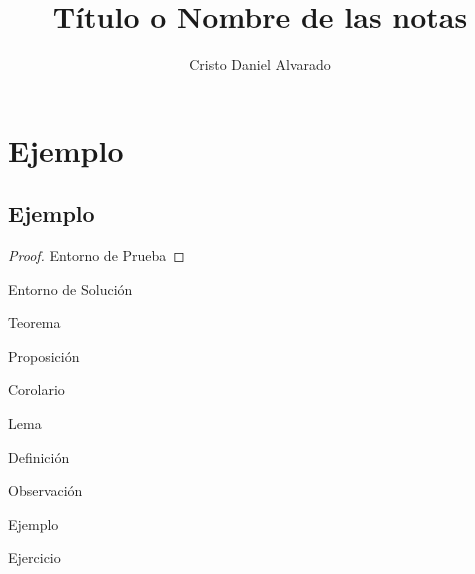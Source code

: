 \documentclass[12pt]{report}
\theoremstyle{largebreak}
\begin{document}
\setlength{\parskip}{5pt}
\setlength{\parindent}{12pt}
\title{T\'itulo o Nombre de las notas}
\author{Cristo Daniel Alvarado}
\maketitle

\tableofcontents

\lstlistoflistings

\newpage

\chapter{Ejemplo}

\section{Ejemplo}

\begin{proof}
    Entorno de Prueba
\end{proof}

\begin{sol}
    Entorno de Soluci\'on
\end{sol}

\begin{theor}[Nombre]
    Teorema
\end{theor}

\begin{propo}[Nombre]
    Proposici\'on
\end{propo}

\begin{cor}[Nombre]
    Corolario
\end{cor}

\begin{lema}[Nombre]
    Lema
\end{lema}

\begin{mydef}[Nombre]
    Definici\'on
\end{mydef}

\begin{obs}[Nombre]
    Observaci\'on
\end{obs}

\begin{exa}[Nombre]
    Ejemplo
\end{exa}

\begin{excer}[Nombre]
    Ejercicio
\end{excer}
\end{document}
